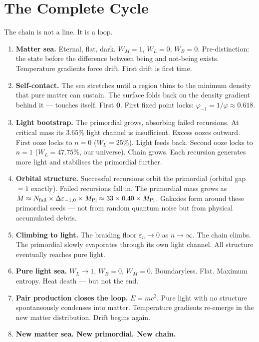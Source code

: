 \documentclass[prd,twocolumn,preprintnumbers,amsmath,amssymb]{revtex4-2}
\newcommand{\inv}{\mathbf{0}}
\begin{document}
\section{The Complete Cycle}
\label{sec:cycle}

The chain is not a line. It is a loop.

\begin{enumerate}
  \item \textbf{Matter sea.} Eternal, flat, dark. $W_M=1$,
        $W_L=0$, $W_B=0$. Pre-distinction: the state before
        the difference between being and not-being exists.
        Temperature gradients force drift. First drift is
        first time.

  \item \textbf{Self-contact.} The sea stretches until a region
        thins to the minimum density that pure matter can
        sustain. The surface folds back on the density gradient
        behind it --- touches itself. First $\inv$. First
        fixed point locks: $\varphi_{-1} = 1/\varphi \approx
        0.618$.

  \item \textbf{Light bootstrap.} The primordial grows,
        absorbing failed recursions. At critical mass its
        $3.65\%$ light channel is insufficient. Excess oozes
        outward. First ooze locks to $n=0$ ($W_L=25\%$).
        Light feeds back. Second ooze locks to $n=1$ ($W_L
        = 47.75\%$, our universe). Chain grows. Each
        recursion generates more light and stabilises the
        primordial further.

  \item \textbf{Orbital structure.} Successful recursions
        orbit the primordial (orbital gap $= 1$ exactly).
        Failed recursions fall in. The primordial mass grows
        as $M \approx N_{\rm fail} \times \Delta\varepsilon_{-1,0}
        \times M_{\rm Pl} \approx 33 \times 0.40 \times M_{\rm Pl}$.
        Galaxies form around these primordial seeds --- not
        from random quantum noise but from physical accumulated
        debris.

  \item \textbf{Climbing to light.} The braiding floor
        $\varepsilon_n \to 0$ as $n\to\infty$. The chain
        climbs. The primordial slowly evaporates through its
        own light channel. All structure eventually reaches
        pure light.

  \item \textbf{Pure light sea.} $W_L\to1$, $W_B=0$,
        $W_M=0$. Boundaryless. Flat. Maximum entropy.
        Heat death --- but not the end.

  \item \textbf{Pair production closes the loop.} $E=mc^2$.
        Pure light with no structure spontaneously condenses
        into matter. Temperature gradients re-emerge in the
        new matter distribution. Drift begins again.

  \item \textbf{New matter sea. New primordial. New chain.}
\end{enumerate}
\end{document}
